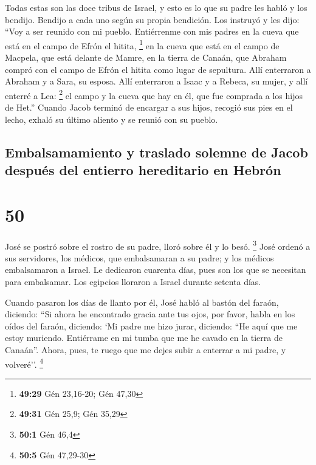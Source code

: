  Todas estas son las doce tribus de Israel, y esto es lo
que su padre les habló y los bendijo. Bendijo a cada uno según su propia
bendición.  Los instruyó y les dijo: ``Voy a ser reunido
con mi pueblo. Entiérrenme con mis padres en la cueva que está en el
campo de Efrón el hitita, \footnote{\textbf{49:29} Gén 23,16-20; Gén
  47,30}  en la cueva que está en el campo de Macpela,
que está delante de Mamre, en la tierra de Canaán, que Abraham compró
con el campo de Efrón el hitita como lugar de sepultura. 
Allí enterraron a Abraham y a Sara, su esposa. Allí enterraron a Isaac y
a Rebeca, su mujer, y allí enterré a Lea: \footnote{\textbf{49:31} Gén
  25,9; Gén 35,29}  el campo y la cueva que hay en él,
que fue comprada a los hijos de Het.''  Cuando Jacob
terminó de encargar a sus hijos, recogió sus pies en el lecho, exhaló su
último aliento y se reunió con su pueblo.

\hypertarget{embalsamamiento-y-traslado-solemne-de-jacob-despuuxe9s-del-entierro-hereditario-en-hebruxf3n}{%
\subsection{Embalsamamiento y traslado solemne de Jacob después del
entierro hereditario en
Hebrón}\label{embalsamamiento-y-traslado-solemne-de-jacob-despuuxe9s-del-entierro-hereditario-en-hebruxf3n}}

\hypertarget{section-49}{%
\section{50}\label{section-49}}

 José se postró sobre el rostro de su padre, lloró sobre
él y lo besó. \footnote{\textbf{50:1} Gén 46,4}  José
ordenó a sus servidores, los médicos, que embalsamaran a su padre; y los
médicos embalsamaron a Israel.  Le dedicaron cuarenta
días, pues son los que se necesitan para embalsamar. Los egipcios
lloraron a Israel durante setenta días.

 Cuando pasaron los días de llanto por él, José habló al
bastón del faraón, diciendo: ``Si ahora he encontrado gracia ante tus
ojos, por favor, habla en los oídos del faraón, diciendo: 
`Mi padre me hizo jurar, diciendo: ``He aquí que me estoy muriendo.
Entiérrame en mi tumba que me he cavado en la tierra de Canaán''. Ahora,
pues, te ruego que me dejes subir a enterrar a mi padre, y volveré''.
\footnote{\textbf{50:5} Gén 47,29-30}

